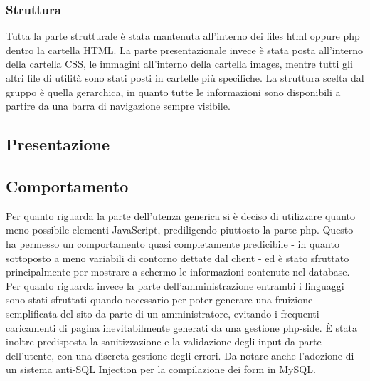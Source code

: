 \subsubsection{Struttura}
Tutta la parte strutturale è stata mantenuta all'interno dei files html oppure php dentro la cartella HTML. La parte presentazionale invece è stata posta all'interno della cartella CSS, le immagini all'interno della cartella images, mentre tutti gli altri file di utilità sono stati posti in cartelle più specifiche. La struttura scelta dal gruppo è quella gerarchica, in quanto tutte le informazioni sono disponibili a partire da una barra di navigazione sempre visibile.
\subsection{Presentazione}
\subsection{Comportamento}

Per quanto riguarda la parte dell'utenza generica si è deciso di utilizzare quanto meno possibile elementi JavaScript, prediligendo piuttosto la parte php. Questo ha permesso un comportamento quasi completamente predicibile - in quanto sottoposto a meno variabili di contorno dettate dal client - ed è stato sfruttato principalmente per mostrare a schermo le informazioni contenute nel database.
\\Per quanto riguarda invece la parte dell'amministrazione entrambi i linguaggi sono stati sfruttati quando necessario per poter generare una fruizione semplificata del sito da parte di un amministratore, evitando i frequenti caricamenti di pagina inevitabilmente generati da una gestione php-side. È stata inoltre predisposta la sanitizzazione e la validazione degli input da parte dell'utente, con una discreta gestione degli errori. Da notare anche l'adozione di un sistema anti-SQL Injection per la compilazione dei form in MySQL.
